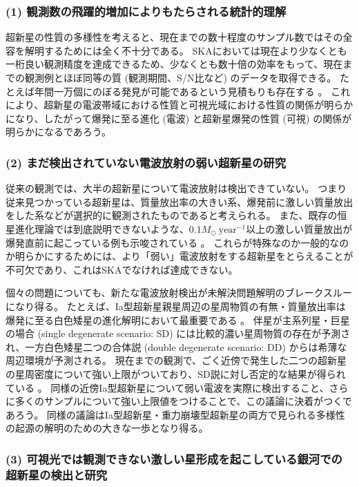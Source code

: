\subsubsection{(1) 観測数の飛躍的増加によりもたらされる統計的理解}

超新星の性質の多様性を考えると、現在までの数十程度のサンプル数ではその全容を解明するためには全く不十分である。
SKAにおいては現在より少なくとも一桁良い観測精度を達成できるため、少なくとも数十倍の効率をもって、現在までの観測例とほぼ同等の質 (観測期間、S/N比など) のデータを取得できる。
たとえば年間一万個にのぼる発見が可能であるという見積もりも存在する \citep[e.g.,][]{2014arXiv1409.1827P}。
これにより、超新星の電波帯域における性質と可視光域における性質の関係が明らかになり、したがって爆発に至る進化 (電波) と超新星爆発の性質 (可視) の関係が明らかになるであろう。

\subsubsection{(2) まだ検出されていない電波放射の弱い超新星の研究}

従来の観測では、大半の超新星について電波放射は検出できていない。
つまり従来見つかっている超新星は、質量放出率の大きい系、爆発前に激しい質量放出をした系などが選択的に観測されたものであると考えられる。
また、既存の恒星進化理論では到底説明できないような、$0.1M_\odot~\text{year}^{-1}$以上の激しい質量放出が爆発直前に起こっている例も示唆されている \citep[e.g.,][]{2014ApJ...790L..16M}。
これらが特殊なのか一般的なのか明らかにするためには、より「弱い」電波放射をする超新星をとらえることが不可欠であり、これはSKAでなければ達成できない。

個々の問題についても、新たな電波放射検出が未解決問題解明のブレークスルーになり得る。
たとえば、Ia型超新星親星周辺の星周物質の有無・質量放出率は爆発に至る白色矮星の進化解明において最重要である \citep[e.g.,][]{2013FrPhy...8..116H}。
伴星が主系列星・巨星の場合 (single degenerate scenario: SD) には比較的濃い星周物質の存在が予測され、一方白色矮星二つの合体説 (double degenerate scenario: DD) からは希薄な周辺環境が予測される。
現在までの観測で、ごく近傍で発生した二つの超新星の星周密度について強い上限がついており、SD説に対し否定的な結果が得られている \citep{2014arXiv1409.1827P}。
同様の近傍Ia型超新星について弱い電波を実際に検出すること、さらに多くのサンプルについて強い上限値をつけることで、この議論に決着がつくであろう。
同様の議論はIa型超新星・重力崩壊型超新星の両方で見られる多様性の起源の解明のための大きな一歩となり得る。

\subsubsection{(3) 可視光では観測できない激しい星形成を起こしている銀河での超新星の検出と研究}

